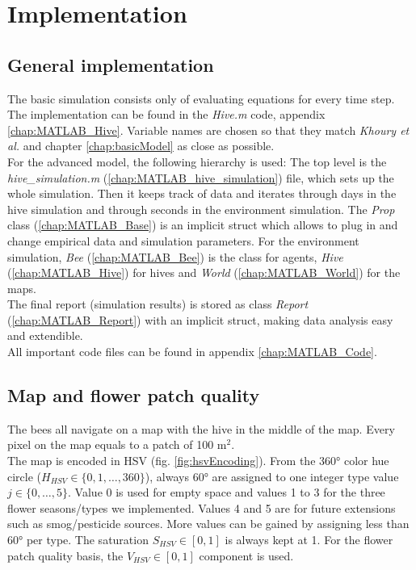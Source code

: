 \section{Implementation}
\subsection{General implementation}
	The basic simulation consists only of evaluating equations for every time step. The implementation can be found in the \textit{Hive.m} code, appendix \ref{chap:MATLAB_Hive}. Variable names are chosen so that they match \textit{Khoury et al.} \cite{khoury13} and chapter \ref{chap:basicModel} as close as possible.\\
	For the advanced model, the following hierarchy is used: The top level is the \textit{hive\_simulation.m} (\ref{chap:MATLAB_hive_simulation}) file, which sets up the whole simulation. Then it keeps track of data and iterates through days in the hive simulation and through seconds in the environment simulation. The \textit{Prop} class (\ref{chap:MATLAB_Base}) is an implicit struct which allows to plug in and change empirical data and simulation parameters. For the environment simulation, \textit{Bee} (\ref{chap:MATLAB_Bee}) is the class for agents, \textit{Hive} (\ref{chap:MATLAB_Hive}) for hives and \textit{World} (\ref{chap:MATLAB_World}) for the maps.\\
	The final report (simulation results) is stored as class \textit{Report} (\ref{chap:MATLAB_Report}) with an implicit struct, making data analysis easy and extendible.\\
	All important code files can be found in appendix \ref{chap:MATLAB_Code}.
	
\subsection{Map and flower patch quality}
	\label{chap:mapFlowerPatchQuality}
	
	The bees all navigate on a map with the hive in the middle of the map. Every pixel on the map equals to a patch of 100 m$^2$.\\
	
	The map is encoded in HSV (fig. \ref{fig:hsvEncoding}). From the 360° color hue circle ($H_{HSV} \in \{0,1,\ldots,360\}$), always 60° are assigned to one integer type value $j \in \{0,\ldots,5\}$. Value 0 is used for empty space and values 1 to 3 for the three flower seasons/types we implemented. Values 4 and 5 are for future extensions such as smog/pesticide sources. More values can be gained by assigning less than 60° per type. The saturation $S_{HSV} \in [0,1]$ is always kept at 1. For the flower patch quality basis, the $V_{HSV} \in [0,1]$ component is used.\\
	
